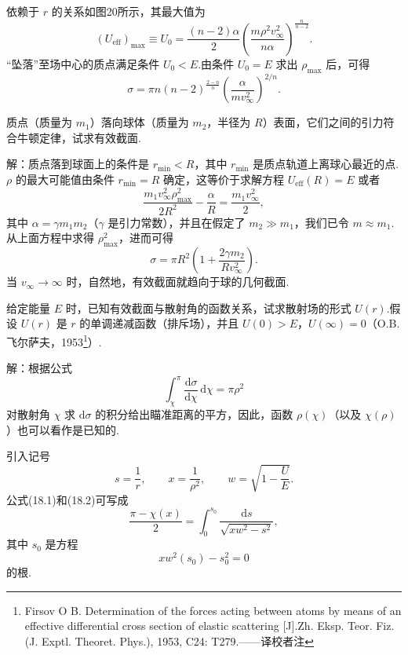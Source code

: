 \begin{xiti}
依赖于 $r$ 的关系如图20所示，其最大值为
\begin{equation*}
  \left(U_\mathrm{eff}\right)_\mathrm{max}\equiv U_0
  =\frac{(n-2)\alpha}{2}\left(\frac{m\rho^2v_\infty^2}{n\alpha}\right)^{\frac{n}{n-2}}.
\end{equation*}
“坠落”至场中心的质点满足条件 $U_0<E$.由条件 $U_0=E$ 求出 $\rho_\mathrm{max}$ 后，可得
\begin{equation*}
  \sigma=\pi n(n-2)^{\frac{2-n}{n}}\left(\frac{\alpha}{mv_\infty^2}\right)^{2/n}.
\end{equation*}

\quad 质点（质量为 $m_1$）落向球体（质量为 $m_2$，半径为 $R$）表面，它们之间的引力符合牛顿定律，试求有效截面.

解：质点落到球面上的条件是 $r_\mathrm{min}<R$，其中 $r_\mathrm{min}$ 是质点轨道上离球心最近的点.$\rho$ 的最大可能值由条件 $r_\mathrm{min}=R$ 确定，这等价于求解方程 $U_\mathrm{eff}(R)=E$ 或者
\begin{equation*}
  \frac{m_1v_\infty^2\rho_\mathrm{max}^2}{2R^2}-\frac{\alpha}{R}
  =\frac{m_1v_\infty^2}{2},
\end{equation*}
其中 $\alpha=\gamma m_1m_2$（$\gamma$ 是引力常数），并且在假定了 $m_2\gg m_1$，我们已令 $m\approx m_1$.从上面方程中求得 $\rho_\mathrm{max}^2$，进而可得
\begin{equation*}
  \sigma=\pi R^2\left(1+\frac{2\gamma m_2}{Rv_\infty^2}\right).
\end{equation*}
当 $v_\infty\to\infty$ 时，自然地，有效截面就趋向于球的几何截面.

\quad 给定能量 $E$ 时，已知有效截面与散射角的函数关系，试求散射场的形式 $U(r)$.假设 $U(r)$ 是 $r$ 的单调递减函数（排斥场），并且 $U(0)>E$，$U(\infty)=0$（O.B.飞尔萨夫，1953\footnote{Firsov O B. Determination of the forces acting between atoms by means of an effective differential cross section of elastic scattering [J].Zh. Eksp. Teor. Fiz. (J. Exptl. Theoret. Phys.), 1953, C24: T279.——译校者注}）.

解：根据公式
\begin{equation*}
  \int_{\chi}^{\pi}\frac{\mathrm{d}\sigma}{\mathrm{d}\chi}\,\mathrm{d}\chi=\pi\rho^2\tag{1}
\end{equation*}
对散射角 $\chi$ 求 $\mathrm{d}\sigma$ 的积分给出瞄准距离的平方，因此，函数 $\rho(\chi)$（以及 $\chi(\rho)$）也可以看作是已知的.

引入记号
\begin{equation*}
  s=\frac{1}{r},\qquad x=\frac{1}{\rho^2},\qquad
  w=\sqrt{1-\frac{U}{E}}.\tag{2}
\end{equation*}
公式(18.1)和(18.2)可写成
\begin{equation*}
  \frac{\pi-\chi(x)}{2}=\int_0^{s_0}\frac{\mathrm{d}s}{\sqrt{xw^2-s^2}},\tag{3}
\end{equation*}
其中 $s_0$ 是方程
\begin{equation*}
  xw^2(s_0)-s_0^2=0
\end{equation*}
的根.


\end{xiti}
